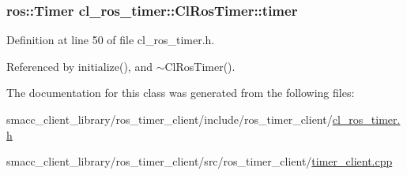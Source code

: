 \subsubsection[{\texorpdfstring{timer}{timer}}]{\setlength{\rightskip}{0pt plus 5cm}ros\+::\+Timer cl\+\_\+ros\+\_\+timer\+::\+Cl\+Ros\+Timer\+::timer\hspace{0.3cm}{\ttfamily [protected]}}\hypertarget{classcl__ros__timer_1_1ClRosTimer_a50237ecbf49b178b9d109b25ba768f5a}{}\label{classcl__ros__timer_1_1ClRosTimer_a50237ecbf49b178b9d109b25ba768f5a}


Definition at line 50 of file cl\+\_\+ros\+\_\+timer.\+h.



Referenced by initialize(), and $\sim$\+Cl\+Ros\+Timer().



The documentation for this class was generated from the following files\+:\begin{DoxyCompactItemize}
\item 
smacc\+\_\+client\+\_\+library/ros\+\_\+timer\+\_\+client/include/ros\+\_\+timer\+\_\+client/\hyperlink{cl__ros__timer_8h}{cl\+\_\+ros\+\_\+timer.\+h}\item 
smacc\+\_\+client\+\_\+library/ros\+\_\+timer\+\_\+client/src/ros\+\_\+timer\+\_\+client/\hyperlink{timer__client_8cpp}{timer\+\_\+client.\+cpp}\end{DoxyCompactItemize}
